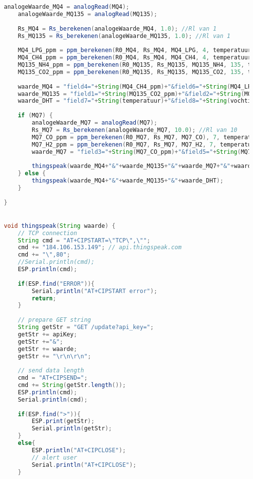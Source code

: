 \begin{lstlisting}[language=Java,caption={MQ sensoren naar Thingspeak}]
    analogeWaarde_MQ4 = analogRead(MQ4);
    analogeWaarde_MQ135 = analogRead(MQ135);
    
    Rs_MQ4 = Rs_berekenen(analogeWaarde_MQ4, 1.0); //Rl van 1
    Rs_MQ135 = Rs_berekenen(analogeWaarde_MQ135, 1.0); //Rl van 1
    
    MQ4_LPG_ppm = ppm_berekenen(R0_MQ4, Rs_MQ4, MQ4_LPG, 4, temperatuur, vochtigheid);
    MQ4_CH4_ppm = ppm_berekenen(R0_MQ4, Rs_MQ4, MQ4_CH4, 4, temperatuur, vochtigheid);
    MQ135_NH4_ppm = ppm_berekenen(R0_MQ135, Rs_MQ135, MQ135_NH4, 135, temperatuur, vochtigheid);
    MQ135_CO2_ppm = ppm_berekenen(R0_MQ135, Rs_MQ135, MQ135_CO2, 135, temperatuur, vochtigheid);
    
    waarde_MQ4 = "field4="+String(MQ4_CH4_ppm)+"&field6="+String(MQ4_LPG_ppm);
    waarde_MQ135 = "field1="+String(MQ135_CO2_ppm)+"&field2="+String(MQ135_NH4_ppm);
    waarde_DHT = "field7="+String(temperatuur)+"&field8="+String(vochtigheid);
    
    if (MQ7) {
        analogeWaarde_MQ7 = analogRead(MQ7);
        Rs_MQ7 = Rs_berekenen(analogeWaarde_MQ7, 10.0); //Rl van 10
        MQ7_CO_ppm = ppm_berekenen(R0_MQ7, Rs_MQ7, MQ7_CO), 7, temperatuur, vochtigheid;
        MQ7_H2_ppm = ppm_berekenen(R0_MQ7, Rs_MQ7, MQ7_H2, 7, temperatuur, vochtigheid);
        waarde_MQ7 = "field3="+String(MQ7_CO_ppm)+"&field5="+String(MQ7_H2_ppm);
        
        thingspeak(waarde_MQ4+"&"+waarde_MQ135+"&"+waarde_MQ7+"&"+waarde_DHT);
    } else {
        thingspeak(waarde_MQ4+"&"+waarde_MQ135+"&"+waarde_DHT);
    }
    
}


void thingspeak(String waarde) {
    // TCP connection
    String cmd = "AT+CIPSTART=\"TCP\",\"";
    cmd += "184.106.153.149"; // api.thingspeak.com
    cmd += "\",80";
    //Serial.println(cmd);
    ESP.println(cmd);
    
    if(ESP.find("ERROR")){
        Serial.println("AT+CIPSTART error");
        return;
    }
    
    // prepare GET string
    String getStr = "GET /update?api_key=";
    getStr += apiKey;
    getStr +="&";
    getStr += waarde;
    getStr += "\r\n\r\n";
    
    // send data length
    cmd = "AT+CIPSEND=";
    cmd += String(getStr.length());
    ESP.println(cmd);
    Serial.println(cmd);
    
    if(ESP.find(">")){
        ESP.print(getStr);
        Serial.println(getStr);
    }
    else{
        ESP.println("AT+CIPCLOSE");
        // alert user
        Serial.println("AT+CIPCLOSE");
    }
    

\end{lstlisting}
